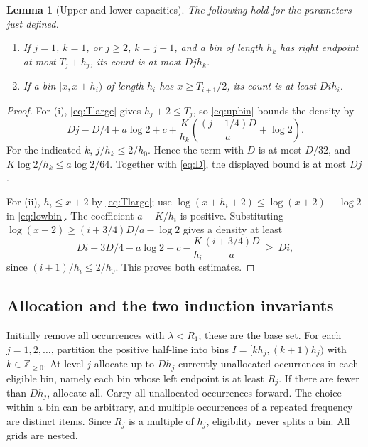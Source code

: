 \documentclass[11pt,letterpaper]{article}
\newtheorem{lemma}[theorem]{Lemma}
\theoremstyle{remark}\newtheorem{remark}[theorem]{Remark}
\begin{document}
\begin{lemma}[Upper and lower capacities]\label{lem:capacities}
The following hold for the parameters just defined.
\begin{enumerate}[label=(\roman*)]
\item If $j=1$, $k=1$, or $j\ge2$, $k=j-1$, and a bin of length $h_k$ has right endpoint at most $T_j+h_j$, its count is at most $Dj h_k$.
\item If a bin $[x,x+h_i)$ of length $h_i$ has $x\ge T_{i+1}/2$, its count is at least $Di h_i$.
\end{enumerate}
\end{lemma}
\begin{proof}
For (i), \eqref{eq:Tlarge} gives $h_j+2\le T_j$, so \eqref{eq:upbin} bounds the density by
\[
 Dj-D/4+a\log2+c+\frac{K}{h_k}\left(\frac{(j-1/4)D}{a}+\log2\right).
\]
For the indicated $k$, $j/h_k\le2/h_0$. Hence the term with $D$ is at most $D/32$, and $K\log2/h_k\le a\log2/64$. Together with \eqref{eq:D}, the displayed bound is at most $Dj$.

For (ii), $h_i\le x+2$ by \eqref{eq:Tlarge}; use $\log(x+h_i+2)\le\log(x+2)+\log2$ in \eqref{eq:lowbin}. The coefficient $a-K/h_i$ is positive. Substituting $\log(x+2)\ge (i+3/4)D/a-\log2$ gives a density at least
\[
 Di+3D/4-a\log2-c-\frac K{h_i}\frac{(i+3/4)D}{a}\ \ge\ Di,
\]
since $(i+1)/h_i\le2/h_0$. This proves both estimates.
\end{proof}

\subsection{Allocation and the two induction invariants}
Initially remove all occurrences with $\lambda<R_1$; these are the base set. For each $j=1,2,\ldots$, partition the positive half-line into bins $I=[kh_j,(k+1)h_j)$ with $k\in\mathbb Z_{\ge0}$. At level $j$ allocate up to $Dh_j$ currently unallocated occurrences in each eligible bin, namely each bin whose left endpoint is at least $R_j$. If there are fewer than $Dh_j$, allocate all. Carry all unallocated occurrences forward. The choice within a bin can be arbitrary, and multiple occurrences of a repeated frequency are distinct items. Since $R_j$ is a multiple of $h_j$, eligibility never splits a bin. All grids are nested.
\end{document}
